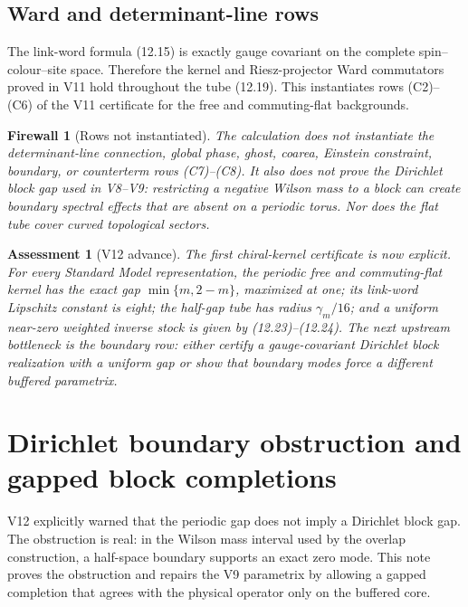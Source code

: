 \documentclass[11pt]{article}
\newtheorem{assessment}[theorem]{Assessment}
\newtheorem{firewall}[theorem]{Firewall}
\begin{document}
\subsection{Ward and determinant-line rows}

The link-word formula (12.15) is exactly gauge covariant on the complete
spin--colour--site space.  Therefore the kernel and Riesz-projector Ward
commutators proved in V11 hold throughout the tube (12.19).  This
instantiates rows (C2)--(C6) of the V11 certificate for the free and
commuting-flat backgrounds.

\begin{firewall}[Rows not instantiated]
\label{fw:v11v12-uninstantiated}
The calculation does not instantiate the determinant-line connection,
global phase, ghost, coarea, Einstein constraint, boundary, or
counterterm rows (C7)--(C8).  It also does not prove the Dirichlet block
gap used in V8--V9: restricting a negative Wilson mass to a block can
create boundary spectral effects that are absent on a periodic torus.
Nor does the flat tube cover curved topological sectors.
\end{firewall}

\begin{assessment}[V12 advance]
\label{ass:v11v12}
The first chiral-kernel certificate is now explicit.  For every Standard
Model representation, the periodic free and commuting-flat kernel has
the exact gap \(\min\{m,2-m\}\), maximized at one; its link-word
Lipschitz constant is eight; the half-gap tube has radius
\(\gamma_m/16\); and a uniform near-zero weighted inverse stock is given
by (12.23)--(12.24).  The next upstream bottleneck is the boundary row:
either certify a gauge-covariant Dirichlet block realization with a
uniform gap or show that boundary modes force a different buffered
parametrix.
\end{assessment}


\section{Dirichlet boundary obstruction and gapped block completions}
\label{sec:v11v13}

V12 explicitly warned that the periodic gap does not imply a Dirichlet
block gap.  The obstruction is real: in the Wilson mass interval used by
the overlap construction, a half-space boundary supports an exact
zero mode.  This note proves the obstruction and repairs the V9
parametrix by allowing a gapped completion that agrees with the physical
operator only on the buffered core.
\end{document}
